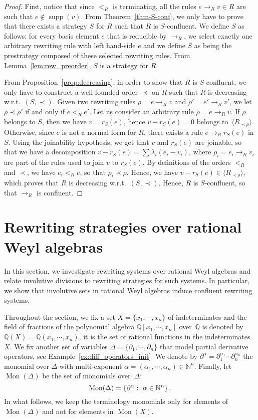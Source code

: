 \documentclass[11pt]{article}
\theoremstyle{definition}
\newcommand\wrt{w.r.t.}
\newcommand\diff[1]{\partial_{#1}}
\newcommand\ordR{<_R}
\newcommand\Rrho{R_{\prec\rho}}
\DeclareMathOperator{\supp}{supp}
\newcommand\Q{\mathbb{Q}}
\newcommand\N{\mathbb{N}}
\newcommand\QX{\mathbb{Q}[x_1,\cdots,x_n]}
\newcommand\QXX{\mathbb{Q}(x_1,\cdots,x_n)}
\newcommand\monBasis{\Mon(\Delta)}
\newcommand\Span[1]{\langle #1\rangle}
\DeclareMathOperator{\Mon}{Mon}
\newcommand\rewR{\to_R}
\begin{document}
\begin{proof}
  First, notice that since $\ordR$ is terminating, all the rules
  $e\rewR v\in R$ are such that $e\notin\supp(v)$. From
  Theorem~\ref{thm-S-conf}, we only have to prove that there exists a
  strategy $S$ for $R$ such that $R$ is $S$-confluent. We define $S$ as
  follows: for every basis element $e$ that is reducible by $\rewR$, we
  select exactly one arbitrary rewriting rule with left hand-side $e$ and
  we define $S$ as being the prestrategy composed of these selected
  rewriting rules. From Lemma~\ref{lem:rew_preorder}, $S$ is a strategy
  for $R$.
  \smallskip

  From Proposition~\ref{prop:decreasing}, in order to show that $R$ is
  $S$-confluent, we only have to construct a well-founded order $\prec$
  on $R$ such that $R$ is decreasing \wrt\ $(S,\prec)$. Given two
  rewriting rules $\rho=e\rewR v$ and $\rho'=e'\rewR v'$, we let
  $\rho\prec\rho'$ if and only if $e\ordR e'$. Let us consider an
  arbitrary rule $\rho=e\rewR v$. If $\rho$ belongs to $S$, then we have
  $v=r_S(e)$, hence $v-r_S(e)=0$ belongs to~$\Span{\Rrho}$. Otherwise,
  since $e$ is not a normal form for $R$, there exists a rule
  $e\rewR r_S(e)$ in $S$. Using the joinability hypothesis, we get that
  $v$ and $r_S(e)$ are joinable, so that we have a decomposition
  $v-r_S(e)=\sum\lambda_i(e_i-v_i)$, where $\rho_i=e_i\rewR v_i$ are part
  of the rules used to join $v$ to $r_S(e)$. By definitions of the orders
  $\ordR$ and $\prec$, we have $e_i\ordR e$, so that $\rho_i\prec\rho$.
  Hence, we have $v-r_S(e)\in\Span{\Rrho}$, which proves that $R$ is
  decreasing \wrt\ $(S,\prec)$. Hence, $R$ is $S$-confluent, so that
  $\rewR$ is confluent.
\end{proof}

\section{Rewriting strategies over rational Weyl algebras}
\label{sec:rewriting_strategies_over_rational_Weyl_algebras}

In this section, we investigate rewriting systems over rational Weyl
algebras and relate involutive divisions to rewriting strategies for such
systems. In particular, we show that involutive sets in rational Weyl
algebras induce confluent rewriting systems.
\medskip

Throughout the section, we fix a set $X=\{x_1,\cdots,x_n\}$ of
indeterminates and the field of fractions of the polynomial algebra $\QX$
over~$\Q$ is denoted by $\Q(X)=\QXX$, it is the set of rational
functions in the indeterminates $X$. We fix another set of
variables $\Delta=\{\diff{1},\cdots,\diff{n}\}$ that model partial
derivative operators, see Example~\ref{ex:diff_operators_init}. We denote
by $\partial^{\alpha}=\diff{1}^{\alpha_1}\cdots\diff{n}^{\alpha_n}$ the
monomial over $\Delta$ with multi-exponent
$\alpha=(\alpha_1,\cdots,\alpha_n)\in\N^n$. Finally, let $\monBasis$ be
the set of monomials over~$\Delta$:
\[\monBasis=\left\{\partial^\alpha:\ \alpha\in\N^n\right\}.
\smallskip\]
In what follows, we keep the terminology monomials only for elements of
$\Mon(\Delta)$ and not for elements in $\Mon(X)$.
\end{document}
